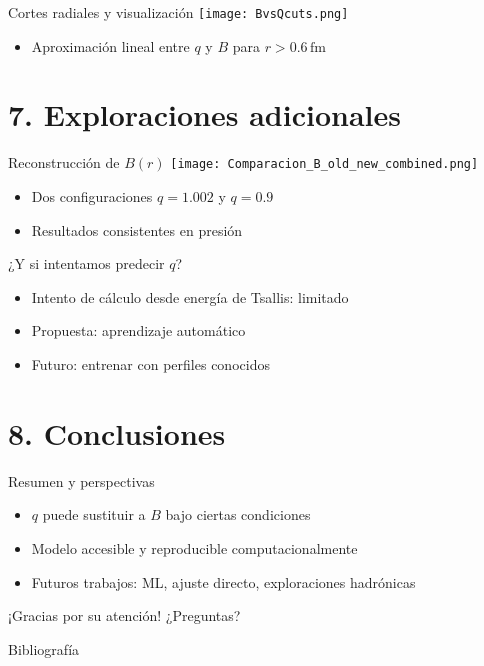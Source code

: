 \documentclass{beamer}
\begin{document}
\begin{frame}{Cortes radiales y visualización}
  \texttt{[image: BvsQcuts.png]}
  \begin{itemize}
    \item Aproximación lineal entre \( q \) y \( B \) para \( r > 0.6\, \mathrm{fm} \)
  \end{itemize}
\end{frame}
\section[Exploraciones adicionales]{7. Exploraciones adicionales}
\begin{frame}{Reconstrucción de \( B(r) \)}
  \texttt{[image: Comparacion\_B\_old\_new\_combined.png]}
  \begin{itemize}
    \item Dos configuraciones \( q = 1.002 \) y \( q = 0.9 \)
    \item Resultados consistentes en presión
  \end{itemize}
\end{frame}

\begin{frame}{¿Y si intentamos predecir \( q \)?}
  \begin{itemize}
    \item Intento de cálculo desde energía de Tsallis: limitado
    \item Propuesta: aprendizaje automático
    \item Futuro: entrenar con perfiles conocidos
  \end{itemize}
\end{frame}
\section[Conclusiones]{8. Conclusiones}
\begin{frame}{Resumen y perspectivas}
  \begin{itemize}
    \item \( q \) puede sustituir a \( B \) bajo ciertas condiciones
    \item Modelo accesible y reproducible computacionalmente
    \item Futuros trabajos: ML, ajuste directo, exploraciones hadrónicas
  \end{itemize}
\end{frame}

\begin{frame}[standout]
  \centering
  \Large ¡Gracias por su atención!
  \centering
  \Huge ¿Preguntas?
\end{frame}

\appendix
\begin{frame}[allowframebreaks]{Bibliografía}
  \printbibliography
\end{frame}
\end{document}
